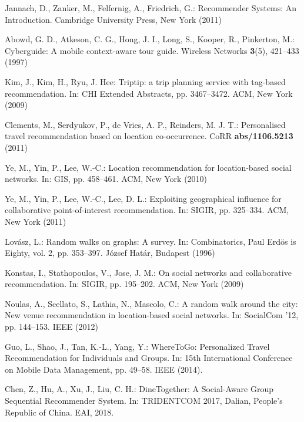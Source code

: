 \documentclass[runningheads]{llncs}
\begin{document}
\begin{thebibliography}{8}

Jannach, D., Zanker, M., Felfernig, A., Friedrich, G.: Recommender Systems: An Introduction. Cambridge University Press, New York (2011)

Abowd, G. D., Atkeson, C. G., Hong, J. I., Long, S., Kooper, R., Pinkerton, M.: Cyberguide: A mobile context-aware tour guide. Wireless Networks \textbf{3}(5), 421--433 (1997)

Kim, J., Kim, H., Ryu, J. Hee: Triptip: a trip planning service with tag-based recommendation. In: CHI Extended Abstracts, pp. 3467--3472. ACM, New York (2009)

Clements, M., Serdyukov, P., de Vries, A. P., Reinders, M. J. T.: Personalised travel recommendation based on location co-occurrence. CoRR \textbf{abs/1106.5213} (2011)

Ye, M., Yin, P., Lee, W.-C.: Location recommendation for location-based social networks. In: GIS, pp. 458--461. ACM, New York (2010)

Ye, M., Yin, P., Lee, W.-C., Lee, D. L.: Exploiting geographical influence for collaborative point-of-interest recommendation. In: SIGIR, pp. 325--334. ACM, New York (2011)

Lovász, L.: Random walks on graphs: A survey. In: Combinatorics, Paul Erdös is Eighty, vol. 2, pp. 353--397. József Határ, Budapest (1996)

Konstas, I., Stathopoulos, V., Jose, J. M.: On social networks and collaborative recommendation. In: SIGIR, pp. 195--202. ACM, New York (2009)

Noulas, A., Scellato, S., Lathia, N., Mascolo, C.: A random walk around the city: New venue recommendation in location-based social networks. In: SocialCom ’12, pp. 144--153. IEEE (2012)

Guo, L., Shao, J., Tan, K.-L., Yang, Y.: WhereToGo: Personalized Travel Recommendation for Individuals and Groups. In: 15th International Conference on Mobile Data Management, pp. 49--58. IEEE (2014). 

Chen, Z., Hu, A., Xu, J., Liu, C. H.: DineTogether: A Social-Aware Group Sequential Recommender System. In: TRIDENTCOM 2017, Dalian, People's Republic of China. EAI, 2018. 








\end{thebibliography}
\end{document}
